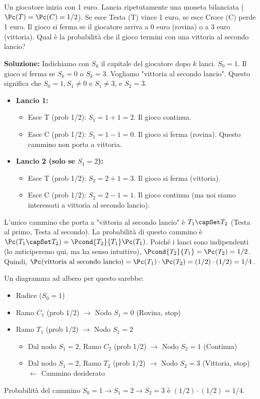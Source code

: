 \begin{exercise}
Un giocatore inizia con 1 euro. Lancia ripetutamente una moneta bilanciata ($\Pc(T) = \Pc(C) = 1/2$). Se esce Testa (T) vince 1 euro, se esce Croce (C) perde 1 euro. Il gioco si ferma se il giocatore arriva a 0 euro (rovina) o a 3 euro (vittoria).
Qual è la probabilità che il gioco termini con una vittoria al secondo lancio?

\textbf{Soluzione:}
Indichiamo con $S_k$ il capitale del giocatore dopo $k$ lanci. $S_0 = 1$.
Il gioco si ferma se $S_k=0$ o $S_k=3$.
Vogliamo "vittoria al secondo lancio". Questo significa che $S_0=1, S_1 \neq 0 \text{ e } S_1 \neq 3$, e $S_2=3$.
\begin{itemize}
    \item \textbf{Lancio 1:}
        \begin{itemize}
            \item Esce T (prob 1/2): $S_1 = 1+1 = 2$. Il gioco continua.
            \item Esce C (prob 1/2): $S_1 = 1-1 = 0$. Il gioco si ferma (rovina). Questo cammino non porta a vittoria.
        \end{itemize}
    \item \textbf{Lancio 2 (solo se $S_1=2$):}
        \begin{itemize}
            \item Esce T (prob 1/2): $S_2 = 2+1 = 3$. Il gioco si ferma (vittoria).
            \item Esce C (prob 1/2): $S_2 = 2-1 = 1$. Il gioco continua (ma noi siamo interessati a vittoria al secondo lancio).
        \end{itemize}
\end{itemize}
L'unico cammino che porta a "vittoria al secondo lancio" è $T_1 \capSet T_2$ (Testa al primo, Testa al secondo).
La probabilità di questo cammino è $\Pc(T_1 \capSet T_2) = \Pcond{T_2}{T_1} \Pc(T_1)$.
Poiché i lanci sono indipendenti (lo anticiperemo qui, ma ha senso intuitivo), $\Pcond{T_2}{T_1} = \Pc(T_2) = 1/2$.
Quindi, $\Pc(\text{vittoria al secondo lancio}) = \Pc(T_1) \cdot \Pc(T_2) = (1/2) \cdot (1/2) = 1/4$.

Un diagramma ad albero per questo sarebbe:
\begin{itemize}
    \item Radice ($S_0=1$)
    \item Ramo $C_1$ (prob 1/2) $\rightarrow$ Nodo $S_1=0$ (Rovina, stop)
    \item Ramo $T_1$ (prob 1/2) $\rightarrow$ Nodo $S_1=2$
        \begin{itemize}
            \item Dal nodo $S_1=2$, Ramo $C_2$ (prob 1/2) $\rightarrow$ Nodo $S_2=1$ (Continua)
            \item Dal nodo $S_1=2$, Ramo $T_2$ (prob 1/2) $\rightarrow$ Nodo $S_2=3$ (Vittoria, stop) $\leftarrow$ Cammino desiderato
        \end{itemize}
\end{itemize}
Probabilità del cammino $S_0=1 \rightarrow S_1=2 \rightarrow S_2=3$ è $(1/2) \cdot (1/2) = 1/4$.
\end{exercise}


